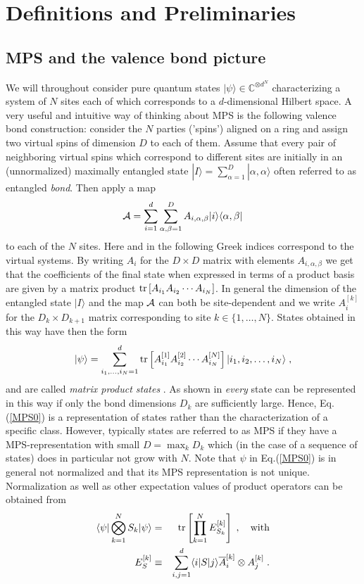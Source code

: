 \documentclass[aps,prl,epsfig,graphics,floatfix,mathbbm,a4paper]{article}
\newcommand{\1}{\mathbbm{1}}
\renewcommand{\>}{\rangle}
\newcommand{\<}{\langle}
\begin{document}
\section{Definitions and Preliminaries}\label{Sec:prelim}
\subsection{MPS and the valence bond picture}
We will throughout consider pure quantum states $|\psi\rangle\in
    \mathbb{C}^{\otimes d^N}$ characterizing a system of $N$ sites
each of which corresponds to a $d$-dimensional Hilbert space. A
very useful and intuitive way of thinking about MPS is the
following valence bond construction: consider the $N$ parties
('spins') aligned on a ring and assign two virtual spins of
dimension $D$ to each of them. Assume that every pair of
neighboring virtual spins which correspond to different sites are
initially in an (unnormalized) maximally entangled state
$|I\rangle=\sum_{\alpha=1}^{D} |\alpha,\alpha\rangle$ often
referred to as entangled \emph{bond}. Then apply a map
\begin{equation}\label{curlyA}{\cal
        A}=\sum_{i=1}^d\sum_{\alpha,\beta=1}^{D} A_{i,\alpha,\beta}
    |i\rangle\langle\alpha,\beta|\end{equation} to each of the $N$
sites. Here and in the following Greek indices correspond to the
virtual systems. By writing $A_{i}$ for the $D\times D$ matrix
with elements $A_{i,\alpha,\beta}$ we get that the coefficients of
the final state when expressed in terms of a product basis are
given by a matrix product $\operatorname{tr}\left[A_{i_1}A_{i_2}\cdots
        A_{i_N}\right]$. In general the dimension of the entangled state
$|I\rangle$ and the map ${\cal A}$ can both be site-dependent and
we write $A_i^{[k]}$ for the $D_k\times D_{k+1}$ matrix
corresponding to site $k\in\{1,\ldots,N\}$. States obtained in
this way have then the form
\begin{equation}\label{MPS0}
    |\psi\rangle=\sum_{i_1,\ldots,i_N=1}^d
    \operatorname{tr}\left[A_{i_1}^{[1]}A_{i_2}^{[2]}\cdots
        A_{i_N}^{[N]}\right]|i_1,i_2,\ldots,i_N\rangle\;,
\end{equation}
and are called \emph{matrix product states} \cite{MPSorigin}. As
shown in \cite{Vi03} \emph{every} state can be represented in this
way if only the bond dimensions $D_k$ are sufficiently large.
Hence, Eq.(\ref{MPS0}) is a representation of states rather than
the characterization of a specific class. However, typically
states are referred to as  MPS if they have a MPS-representation
with small $D=\max_k D_k$ which (in the case of a sequence of
states) does in particular not grow with $N$. Note that $\psi$ in
Eq.(\ref{MPS0}) is in general not normalized and that its MPS
representation is not unique. Normalization as well as other
expectation values of product operators can be obtained from
\begin{eqnarray}\nonumber \langle\psi|\bigotimes_{k=1}^N
    S_k|\psi\rangle &=&\operatorname{tr}\left[\prod_{k=1}^N
        E_{S_k}^{[k]}\right]\;,\quad\text{with}\\
    E_S^{[k]}&\equiv&\sum_{i,j=1}^d \langle i|S|j\rangle
    \overline{A}_i^{[k]}\otimes A_j^{[k]}\label{E}\;.\end{eqnarray}
\end{document}

